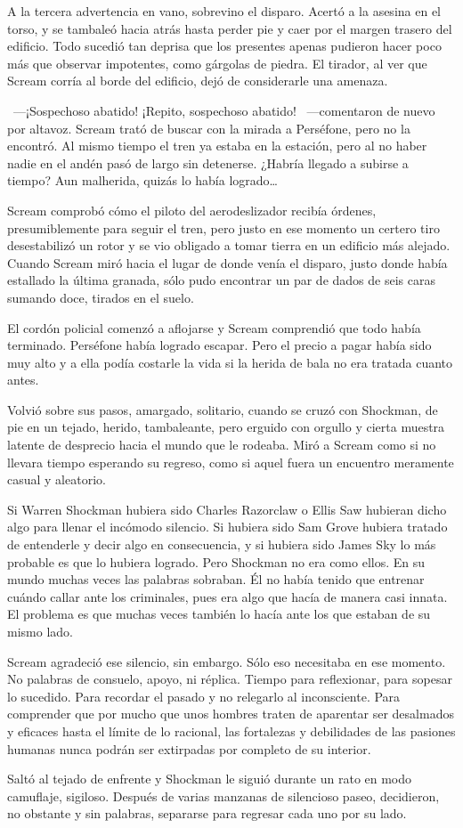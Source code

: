 A la tercera advertencia en vano, sobrevino el disparo. Acertó a la asesina en el torso, y se tambaleó hacia atrás hasta perder pie y caer por el margen trasero del edificio. Todo sucedió tan deprisa que los presentes apenas pudieron hacer poco más que observar impotentes, como gárgolas de piedra. El tirador, al ver que Scream corría al borde del edificio, dejó de considerarle una amenaza.

~---¡Sospechoso abatido! ¡Repito, sospechoso abatido! ~---comentaron de nuevo por altavoz. Scream trató de buscar con la mirada a Perséfone, pero no la encontró. Al mismo tiempo el tren ya estaba en la estación, pero al no haber nadie en el andén pasó de largo sin detenerse. ¿Habría llegado a subirse a tiempo? Aun malherida, quizás lo había logrado\dots

Scream comprobó cómo el piloto del aerodeslizador recibía órdenes, presumiblemente para seguir el tren, pero justo en ese momento un certero tiro desestabilizó un rotor y se vio obligado a tomar tierra en un edificio más alejado. Cuando Scream miró hacia el lugar de donde venía el disparo, justo donde había estallado la última granada, sólo pudo encontrar un par de dados de seis caras sumando doce, tirados en el suelo.

El cordón policial comenzó a aflojarse y Scream comprendió que todo había terminado. Perséfone había logrado escapar. Pero el precio a pagar había sido muy alto y a ella podía costarle la vida si la herida de bala no era tratada cuanto antes.

Volvió sobre sus pasos, amargado, solitario, cuando se cruzó con Shockman, de pie en un tejado, herido, tambaleante, pero erguido con orgullo y cierta muestra latente de desprecio hacia el mundo que le rodeaba. Miró a Scream como si no llevara tiempo esperando su regreso, como si aquel fuera un encuentro meramente casual y aleatorio.

Si Warren Shockman hubiera sido Charles Razorclaw o Ellis Saw hubieran dicho algo para llenar el incómodo silencio. Si hubiera sido Sam Grove hubiera tratado de entenderle y decir algo en consecuencia, y si hubiera sido James Sky lo más probable es que lo hubiera logrado. Pero Shockman no era como ellos. En su mundo muchas veces las palabras sobraban. Él no había tenido que entrenar cuándo callar ante los criminales, pues era algo que hacía de manera casi innata. El problema es que muchas veces también lo hacía ante los que estaban de su mismo lado.

Scream agradeció ese silencio, sin embargo. Sólo eso necesitaba en ese momento. No palabras de consuelo, apoyo, ni réplica. Tiempo para reflexionar, para sopesar lo sucedido. Para recordar el pasado y no relegarlo al inconsciente. Para comprender que por mucho que unos hombres traten de aparentar ser desalmados y eficaces hasta el límite de lo racional, las fortalezas y debilidades de las pasiones humanas nunca podrán ser extirpadas por completo de su interior.

Saltó al tejado de enfrente y Shockman le siguió durante un rato en modo camuflaje, sigiloso. Después de varias manzanas de silencioso paseo, decidieron, no obstante y sin palabras, separarse para regresar cada uno por su lado.

\endinput
